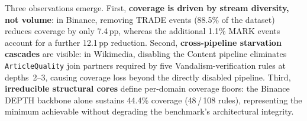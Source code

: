 Three observations emerge.
First, \textbf{coverage is driven by stream diversity, not volume}: in Binance, removing TRADE events (88.5\% of the dataset) reduces coverage by only 7.4\,pp, whereas the additional 1.1\% MARK events account for a further 12.1\,pp reduction.
Second, \textbf{cross-pipeline starvation cascades} are visible: in Wikimedia, disabling the Content pipeline eliminates \texttt{ArticleQuality} join partners required by five Vandalism-verification rules at depths~2--3, causing coverage loss beyond the directly disabled pipeline.
Third, \textbf{irreducible structural cores} define per-domain coverage floors: the Binance DEPTH backbone alone sustains 44.4\% coverage (48\,/\,108 rules), representing the minimum achievable without degrading the benchmark's architectural integrity.
